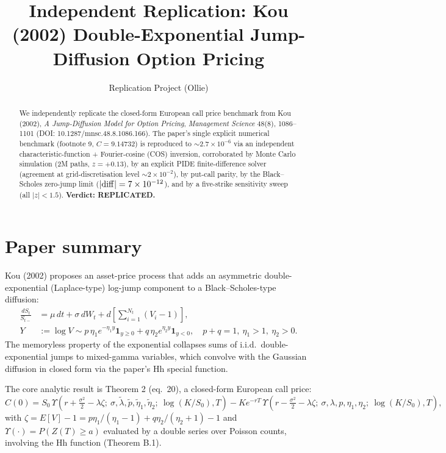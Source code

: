 \documentclass[11pt]{article}
\title{Independent Replication: Kou (2002) Double-Exponential Jump-Diffusion Option Pricing}
\author{Replication Project (Ollie)}
\date{}
\begin{document}
\maketitle

\begin{abstract}
We independently replicate the closed-form European call price benchmark from Kou (2002), \emph{A Jump-Diffusion Model for Option Pricing}, \emph{Management Science} 48(8), 1086--1101 (DOI: 10.1287/mnsc.48.8.1086.166). The paper's single explicit numerical benchmark (footnote 9, $C = 9.14732$) is reproduced to $\sim 2.7 \times 10^{-6}$ via an independent characteristic-function + Fourier-cosine (COS) inversion, corroborated by Monte Carlo simulation (2M paths, $z = +0.13$), by an explicit PIDE finite-difference solver (agreement at grid-discretisation level $\sim 2 \times 10^{-2}$), by put-call parity, by the Black--Scholes zero-jump limit ($|{\rm diff}| = 7 \times 10^{-12}$), and by a five-strike sensitivity sweep (all $|z| < 1.5$). \textbf{Verdict: REPLICATED.}
\end{abstract}

\section{Paper summary}

Kou (2002) proposes an asset-price process that adds an asymmetric double-exponential (Laplace-type) log-jump component to a Black--Scholes-type diffusion:
\begin{align}
\frac{dS_t}{S_{t-}} &= \mu\, dt + \sigma\, dW_t + d\!\left[\sum_{i=1}^{N_t}(V_i - 1)\right], \\
Y &:= \log V \sim p\, \eta_1 e^{-\eta_1 y}\mathbf{1}_{y \ge 0} + q\, \eta_2 e^{\eta_2 y}\mathbf{1}_{y < 0}, \quad p+q=1,\ \eta_1 > 1,\ \eta_2 > 0.
\end{align}
The memoryless property of the exponential collapses sums of i.i.d.\ double-exponential jumps to mixed-gamma variables, which convolve with the Gaussian diffusion in closed form via the paper's Hh special function.

The core analytic result is Theorem 2 (eq.\ 20), a closed-form European call price:
\[
C(0) = S_0\, \Upsilon(r+\tfrac{\sigma^2}{2}-\lambda \zeta;\ \sigma, \tilde\lambda, \tilde p, \tilde\eta_1, \tilde\eta_2;\ \log(K/S_0), T)
     - K e^{-rT}\, \Upsilon(r-\tfrac{\sigma^2}{2}-\lambda \zeta;\ \sigma, \lambda, p, \eta_1, \eta_2;\ \log(K/S_0), T),
\]
with $\zeta = E[V] - 1 = p\eta_1/(\eta_1-1) + q\eta_2/(\eta_2+1) - 1$ and $\Upsilon(\cdot) = P(Z(T)\ge a)$ evaluated by a double series over Poisson counts, involving the Hh function (Theorem B.1).
\end{document}
